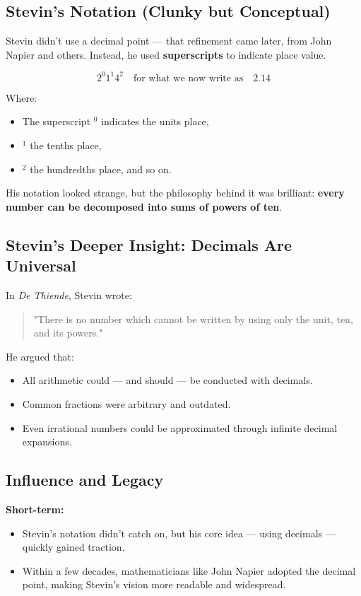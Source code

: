 \subsection{Stevin's Notation (Clunky but Conceptual)}

Stevin didn’t use a decimal point — that refinement came later, from John Napier and others. Instead, he used \textbf{superscripts} to indicate place value.

\[
2^{0}1^{1}4^{2} \quad \text{for what we now write as} \quad 2.14
\]

Where:
\begin{itemize}
    \item The superscript \( ^{0} \) indicates the units place,
    \item \( ^{1} \) the tenths place,
    \item \( ^{2} \) the hundredths place, and so on.
\end{itemize}

His notation looked strange, but the philosophy behind it was brilliant: \textbf{every number can be decomposed into sums of powers of ten}.

\subsection*{Stevin's Deeper Insight: Decimals Are Universal}

In \textit{De Thiende}, Stevin wrote:

\begin{quote}
"There is no number which cannot be written by using only the unit, ten, and its powers."
\end{quote}

He argued that:
\begin{itemize}
    \item All arithmetic could — and should — be conducted with decimals.
    \item Common fractions were arbitrary and outdated.
    \item Even irrational numbers could be approximated through infinite decimal expansions.
\end{itemize}

\subsection{Influence and Legacy}

\textbf{Short-term:}
\begin{itemize}
    \item Stevin’s notation didn’t catch on, but his core idea — using decimals — quickly gained traction.
    \item Within a few decades, mathematicians like John Napier adopted the decimal point, making Stevin’s vision more readable and widespread.
\end{itemize}

